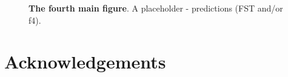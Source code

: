 \documentclass[]{article}
\begin{document}
\begin{figure}[ht]
\begin{center}
    \makebox[\textwidth][c]{} %
\caption{\textbf{The fourth main figure}.
    A placeholder - predictions (FST and/or f4).
}
\label{fig:r4}
\end{center}
\end{figure}

\section*{Acknowledgements}

\break



\end{document}
